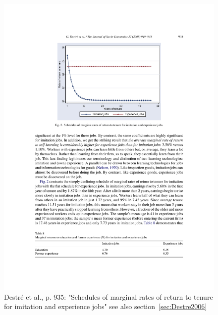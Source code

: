 \documentclass[12pt,a4paper]{article}
\begin{document}
    \begin{figure}[ht]
      \centering
      \includegraphics[width=12cm]{Meeting 4 LEARNING FROM EXPERIENCE - Seite 935.pdf}
      \caption{Destré et al., p. 935: "Schedules of marginal rates of return to tenure for imitation and experience jobs" see also section~\ref{sec:Destre2006}}
      \label{fig:Destré marginalreturntotenure}
    \end{figure}
\end{document}
